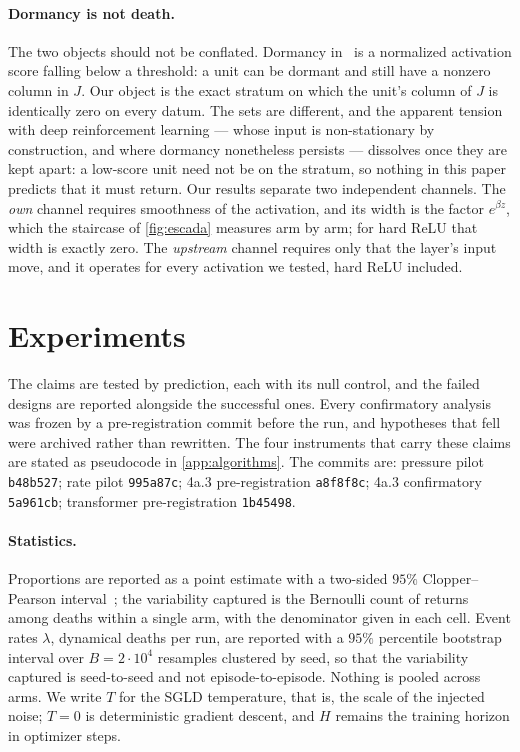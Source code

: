 \documentclass[11pt]{article}
\theoremstyle{definition}
\theoremstyle{remark}
\begin{document}
\paragraph{Dormancy is not death.} The two objects should not be conflated.
Dormancy in~\cite{Sokar23} is a normalized activation score falling below a
threshold: a unit can be dormant and still have a nonzero column in $J$. Our
object is the exact stratum on which the unit's column of $J$ is identically zero
on every datum. The sets are different, and the apparent tension with deep
reinforcement learning --- whose input is non-stationary by construction, and
where dormancy nonetheless persists --- dissolves once they are kept apart: a
low-score unit need not be on the stratum, so nothing in this paper predicts
that it must return. Our results separate two independent channels. The
\emph{own} channel requires smoothness of the activation, and its width is the
factor $e^{\beta z}$, which the staircase of \cref{fig:escada} measures arm by
arm; for hard ReLU that width is exactly zero. The \emph{upstream} channel
requires only that the layer's input move, and it operates for every activation
we tested, hard ReLU included.

\section{Experiments}\label{sec:experiments}

The claims are tested by prediction, each with its null control, and the failed
designs are reported alongside the successful ones. Every confirmatory analysis
was frozen by a pre-registration commit before the run, and hypotheses that fell
were archived rather than rewritten. The four instruments that carry these claims are
stated as pseudocode in \cref{app:algorithms}. The commits are: pressure pilot
\texttt{b48b527}; rate pilot \texttt{995a87c}; 4a.3 pre-registration
\texttt{a8f8f8c}; 4a.3 confirmatory \texttt{5a961cb}; transformer
pre-registration \texttt{1b45498}.

\paragraph{Statistics.}
Proportions are reported as a point estimate with a two-sided $95\%$
Clopper--Pearson interval~\cite{CP34}; the variability captured is the Bernoulli
count of returns among deaths within a single arm, with the denominator given in
each cell. Event rates $\lambda$, dynamical deaths per run, are reported with a
$95\%$ percentile bootstrap interval over $B=2\cdot10^{4}$ resamples clustered by
seed, so that the variability captured is seed-to-seed and not
episode-to-episode. Nothing is pooled across arms. We write $T$ for the SGLD
temperature, that is, the scale of the injected noise; $T=0$ is deterministic
gradient descent, and $H$ remains the training horizon in optimizer steps.
\end{document}
